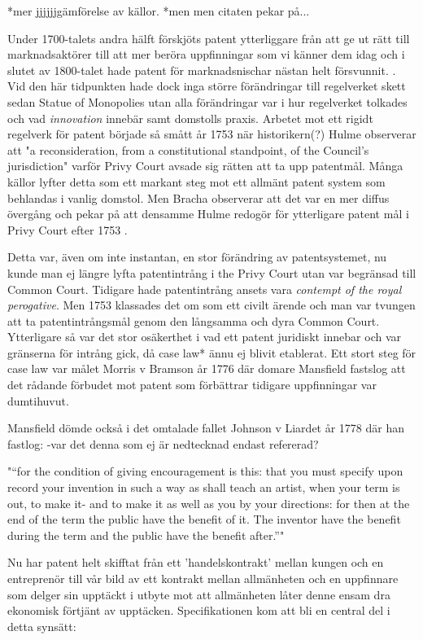 *mer jjjjjjgämförelse av källor. 
*men men citaten pekar på...

Under 1700-talets andra hälft förskjöts patent ytterliggare från att ge ut rätt till marknadsaktörer till att mer beröra uppfinningar som vi känner dem idag och i slutet av 1800-talet hade patent för marknadsnischar nästan helt försvunnit. \cite{bracha}. 
Vid den här tidpunkten hade dock inga större förändringar till regelverket skett sedan Statue of Monopolies
utan alla förändringar var i hur regelverket tolkades och vad \emph{innovation} innebär samt domstolls
praxis. Arbetet mot ett rigidt regelverk för patent började så smått år 1753 när historikern(?) Hulme \cite{hulme} observerar att "a reconsideration, from a constitutional standpoint, of the Council’s jurisdiction" varför Privy Court avsade sig rätten att ta upp patentmål. Många källor lyfter detta som ett markant steg mot ett allmänt patent system som behlandas i vanlig domstol. Men Bracha observerar att det var en mer diffus övergång och pekar på att densamme Hulme redogör för ytterligare patent mål i Privy Court efter 1753 \cite{bracha}.

Detta var, även om inte instantan, en stor förändring av patentsystemet, nu kunde man ej längre lyfta patentintrång i the Privy Court utan var begränsad till Common Court. Tidigare hade patentintrång ansets vara \emph{contempt of the royal perogative}. Men 1753 klassades det om som ett civilt ärende och man var tvungen att ta patentintrångsmål genom den långsamma och dyra Common Court. Ytterligare så var det stor osäkerthet i vad ett patent juridiskt innebar och var gränserna för intrång gick, då case law* ännu ej blivit etablerat. Ett stort steg för case law var målet Morris v Bramson år 1776 där domare Mansfield fastslog att det rådande förbudet mot patent som förbättrar tidigare uppfinningar var dumtihuvut\cite{bracha}.

Mansfield dömde också i det omtalade fallet Johnson v Liardet år 1778 där han fastlog:
 -var det denna som ej är nedtecknad endast refererad?

"“for the condition of giving encouragement is this: that 
you must specify upon record your invention in such a 
way as shall teach an artist, when your term is out, to 
make it- and to make it as well as you by your directions: 
for then at the end of the term the public have the benefit 
of it. The inventor have the benefit during the term and 
the public have the benefit after.”" \cite{hulme}

Nu har patent helt skifftat från ett 'handelskontrakt' mellan kungen och en entreprenör till vår bild av ett kontrakt mellan allmänheten och en uppfinnare som delger sin upptäckt i utbyte mot att allmänheten låter denne ensam dra ekonomisk förtjänt av upptäcken. Specifikationen kom att bli en central del i detta synsätt: 

